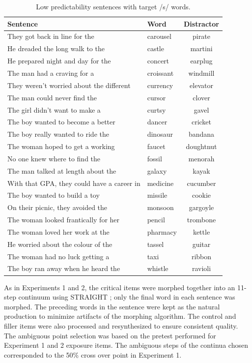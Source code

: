 \begin{table}[!h]
\caption{Low predictability sentences with target /s/ words.}
\label{tbl:sentlows}
\small
\centering
\begin{tabular}{llc}
\toprule
Sentence                                                                     & Word        & Distractor  \\
\midrule
They got back in line for the & carousel & pirate \\
He dreaded the long walk to the & castle & martini \\
He prepared night and day for the & concert & earplug \\
The man had a craving for a & croissant & windmill \\
They weren't worried about the different & currency & elevator \\
The man could never find the & cursor & clover \\
The girl didn't want to make a & curtsy & gavel \\
The boy wanted to become a better & dancer & cricket \\
The boy really wanted to ride the & dinosaur & bandana \\
The woman hoped to get a working & faucet & doughtnut \\
No one knew where to find the & fossil & menorah \\
The man talked at length about the & galaxy & kayak \\
With that GPA, they could have a career in & medicine & cucumber \\
The boy wanted to build a toy & missile & cookie \\
On their picnic, they avoided the & monsoon & gargoyle \\
The woman looked frantically for her & pencil & trombone \\
The woman loved her work at the & pharmacy & kettle \\
He worried about the colour of the & tassel & guitar \\
The woman had no luck getting a & taxi & ribbon \\
The boy ran away when he heard the & whistle & ravioli \\
\bottomrule
\end{tabular}
\end{table}

As in Experiments 1 and 2, the critical items were morphed together into an 11-step continuum using STRAIGHT \citep{Kawahara2008}; only the final word in each sentence was morphed.  
The preceding words in the sentence were kept as the natural production to minimize artifacts of the morphing algorithm.  
The control and filler items were also processed and resynthesized to ensure consistent quality.  
The ambiguous point selection was based on the pretest performed for Experiment 1 and 2 exposure items.  
The ambiguous steps of the continua chosen corresponded to the 50\% cross over point in Experiment 1.

